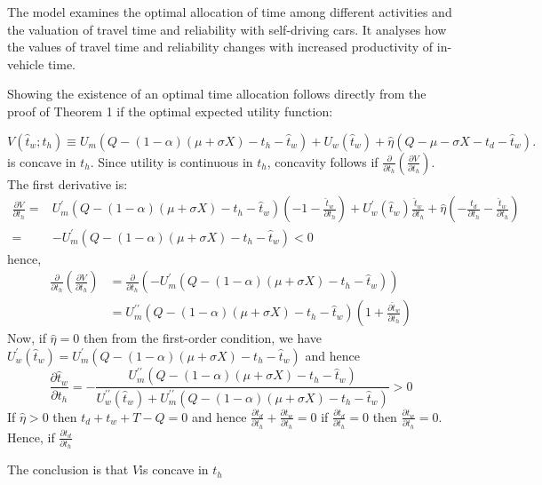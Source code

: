 \documentclass[12pt,a4paper,british]{article}
\begin{document}
The model examines the optimal allocation of time among different activities and the valuation of travel time and reliability with self-driving cars. It analyses how the values of travel time and reliability changes with increased productivity of in-vehicle time.

\clearpage{}


Showing the existence of an optimal time allocation follows directly from the proof of Theorem 1 if the optimal expected utility function:

\begin{equation*}
V\left(\hat{t}_{w};t_{h}\right)\equiv U_{m}\left(Q-\left(1-\alpha\right)\left(\mu+\sigma X\right)-t_{h}-\hat{t}_{w}\right)+U_{w}\left(\hat{t}_{w}\right)+\hat{\eta}\left(Q-\mu-\sigma X-t_{d}-\hat{t}_{w}\right).
\end{equation*}%
is concave in $t_{h}$. Since utility is continuous in $t_{h}$, concavity follows if $\frac{\partial}{\partial t_{h}}\left(\frac{\partial V}{\partial t_{h}}\right)$. The first derivative is:
\begin{align*}
\frac{\partial V}{\partial t_{h}}= & U_{m}^{\prime}\left(Q-\left(1-\alpha\right)\left(\mu+\sigma X\right)-t_{h}-\hat{t}_{w}\right)\left(-1-\frac{\hat{t}_{w}}{\partial t_{h}}\right)+U_{w}^{\prime}\left(\hat{t}_{w}\right)\frac{\hat{t}_{w}}{\partial t_{h}}+\hat{\eta}\left(-\frac{t_{d}}{\partial t_{h}}-\frac{\hat{t}_{w}}{\partial t_{h}}\right)\\
= & -U_{m}^{\prime}\left(Q-\left(1-\alpha\right)\left(\mu+\sigma X\right)-t_{h}-\hat{t}_{w}\right)<0
\end{align*}
hence,
\begin{align*}
\frac{\partial}{\partial t_{h}}\left(\frac{\partial V}{\partial t_{h}}\right) & =\frac{\partial}{\partial t_{h}}\left(-U_{m}^{\prime}\left(Q-\left(1-\alpha\right)\left(\mu+\sigma X\right)-t_{h}-\hat{t}_{w}\right)\right)\\
 & =U_{m}^{\prime\prime}\left(Q-\left(1-\alpha\right)\left(\mu+\sigma X\right)-t_{h}-\hat{t}_{w}\right)\left(1+\frac{\partial\hat{t}_{w}}{\partial t_{h}}\right)
\end{align*}
Now, if $\hat{\eta}=0$ then from the first-order condition, we have $U_{w}^{\prime}\left(\hat{t}_{w}\right)=U_{m}^{\prime}\left(Q-\left(1-\alpha\right)\left(\mu+\sigma X\right)-t_{h}-\hat{t}_{w}\right)$ and hence
\begin{equation*}
\frac{\partial\hat{t}_{w}}{\partial t_{h}}=-\frac{U_{m}^{\prime\prime}\left(Q-\left(1-\alpha\right)\left(\mu+\sigma X\right)-t_{h}-\hat{t}_{w}\right)}{U_{w}^{\prime\prime}\left(\hat{t}_{w}\right)+U_{m}^{\prime\prime}\left(Q-\left(1-\alpha\right)\left(\mu+\sigma X\right)-t_{h}-\hat{t}_{w}\right)}>0
\end{equation*}
If $\hat{\eta}>0$ then $t_{d}+t_{w}+T-Q=0$ and hence $\frac{\partial t_{d}}{\partial t_{h}}+\frac{\partial t_{w}}{\partial t_{h}}=0$ if $\frac{\partial t_{d}}{\partial t_{h}}=0$ then $\frac{\partial t_{w}}{\partial t_{h}}=0$. Hence, if $\frac{\partial t_{d}}{\partial t_{h}}$

The conclusion is that $V$is concave in $t_{h}$
\end{document}
